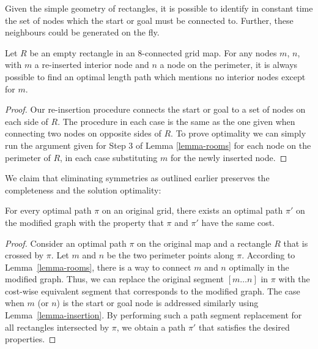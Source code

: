 Given the simple geometry of rectangles, it is possible to identify in constant
time the set of nodes which the start or goal must be connected to.  Further,
these neighbours could be generated on the fly.

\begin{lemma}
\label{lemma-insertion}
Let $R$ be an empty rectangle in an 8-connected grid map.  For any
nodes $m$, $n$, with $m$ a re-inserted interior node and $n$ a node on the
perimeter, it is always possible to find an optimal length path which mentions
no interior nodes except for $m$.
\end{lemma}
\begin{proof}
Our re-insertion procedure connects the start or goal to a set of nodes on each
side of $R$.  The procedure in each case is the same as the one given when
connecting two nodes on opposite sides of $R$.  To prove optimality we can
simply run the argument given for Step 3 of Lemma \ref{lemma-rooms} for each
node on the perimeter of $R$, in each case substituting $m$ for the newly
inserted node.
\end{proof}

We claim that eliminating symmetries as outlined earlier
preserves the completeness and the solution optimality:
\begin{theorem}
For every optimal path $\pi$ on an original grid, there exists an optimal path
$\pi'$ on the modified graph with the property that $\pi$ and $\pi'$ have the
same cost.
\end{theorem}
\begin{proof}
Consider an optimal path $\pi$ on the original map and a rectangle $R$ that is
crossed by $\pi$.  Let $m$ and $n$ be the two perimeter points along $\pi$.
According to Lemma~\ref{lemma-rooms}, there is a way to connect $m$ and $n$
optimally in the modified graph. Thus, we can replace the original segment $[m
\dots n]$ in $\pi$ with the cost-wise equivalent segment that corresponds to the
modified graph.  The case when $m$ (or $n$) is the start or goal node is
addressed similarly using Lemma~\ref{lemma-insertion}.  By performing such a
path segment replacement for all rectangles intersected by $\pi$, we obtain a
path $\pi'$ that satisfies the desired properties.
\end{proof}

